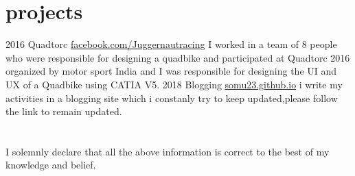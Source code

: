 \documentclass[]{friggeri-cv}
\begin{document}
\section{projects}

\begin{entrylist}
  \entry
    {2016}
    {Quadtorc}
    {\href{https://www.facebook.com/Juggernautracing/}{facebook.com/Juggernautracing}}
    {I worked in a team of 8 people who were responsible for designing a quadbike and participated at Quadtorc 2016 organized by motor sport India and I was responsible for designing the UI and UX of a Quadbike using CATIA V5.}
    {}
  \entry
    {2018}
    {Blogging}
    {\href{http://somu23.github.io/}{somu23.github.io}}
    {i write my activities in a blogging site which i constanly try to keep updated,please follow the link to remain updated.}
\end{entrylist}

\section{}

I solemnly declare that all the above information is correct to the best of my knowledge and belief.

% 
\end{document}
